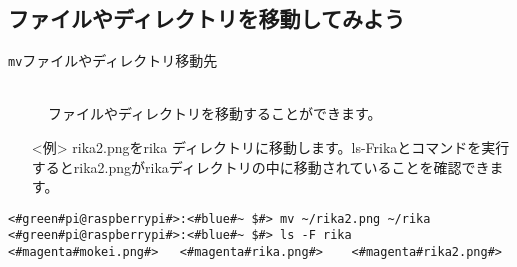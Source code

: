 \subsection{ファイルやディレクトリを移動してみよう}
\begin{description}
\item[\texttt{mv}\textvisiblespace ファイルやディレクトリ\textvisiblespace 移動先]\mbox{}\\
ファイルやディレクトリを移動することができます。
\end{description}
\begin{itemize}
\item[<例>]rika2.pngをrika ディレクトリに移動します。ls\textvisiblespace -F\textvisiblespace rikaとコマンドを実行するとrika2.pngがrikaディレクトリの中に移動されていることを確認できます。
\end{itemize}
\begin{lstlisting}[caption=mvの例, label=mv]
<#green#pi@raspberrypi#>:<#blue#~ $#> mv ~/rika2.png ~/rika
<#green#pi@raspberrypi#>:<#blue#~ $#> ls -F rika
<#magenta#mokei.png#>	<#magenta#rika.png#>	<#magenta#rika2.png#>
\end{lstlisting}

\begin{tcolorbox}[title=\useOmetoi]
\begin{enumerate}
\end{enumerate}
\end{tcolorbox}

